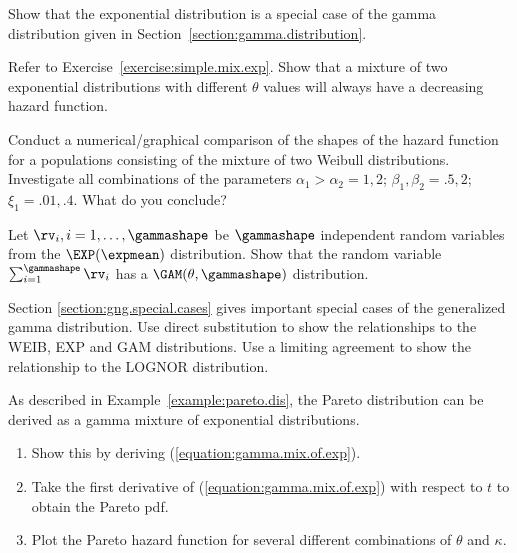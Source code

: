 \begin{exercise}
Show that the exponential distribution is a special case of the
gamma distribution given in Section~\ref{section:gamma.distribution}.
\end{exercise}

\begin{exercise1}
\label{exercise:mix.exp.haz.dec}
Refer to Exercise~\ref{exercise:simple.mix.exp}.
Show that a mixture of two exponential distributions with different
$\theta$ values will always have a decreasing hazard function. 
\end{exercise1}

\begin{exercise1}
Conduct a numerical/graphical comparison of the shapes of
the hazard function for a populations consisting of the mixture of
two Weibull distributions. Investigate all combinations of the
parameters $\alpha_{1} > \alpha_{2}=1,2$;
$\beta_{1}, \beta_{2}=.5,2$; $\xi_{1}=.01,.4.$
What do you conclude?
\end{exercise1}


\begin{exercise1}
Let $\rv_{i}, i=1,\ldots,\gammashape$ be $\gammashape$ independent
random variables from the $ \EXP(\expmean)$ distribution. Show that
the random variable $\sum_{i=1}^{\gammashape} \rv_{i}$ has a
$\GAM(\theta,\gammashape)$ distribution.
\end{exercise1}


\begin{exercise1}
Section \ref{section:gng.special.cases} gives important special cases
of the generalized gamma distribution. Use direct substitution to show
the relationships to the WEIB, EXP and GAM distributions. Use a
limiting agreement to show the relationship to the LOGNOR
distribution.
\end{exercise1}



\begin{exercise1}
As described in Example~\ref{example:pareto.dis},
the Pareto distribution can be derived as a gamma mixture of exponential
distributions.
\begin{enumerate}
\item
Show this by deriving (\ref{equation:gamma.mix.of.exp}).
\item
Take the first derivative of (\ref{equation:gamma.mix.of.exp})
with respect to $t$ to obtain the Pareto pdf.
\item
Plot the Pareto hazard function for several different
combinations of $\theta$ and $\kappa$.
\end{enumerate}
\end{exercise1}

